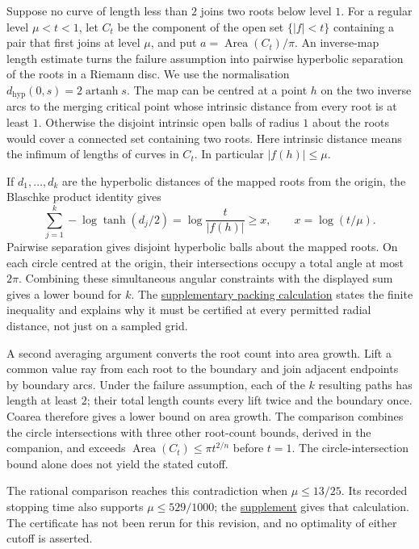 \documentclass[11pt]{article}
\begin{document}
Suppose no curve of length less than $2$ joins two roots below level $1$.
For a regular level $\mu<t<1$, let $C_t$ be the component of the open set
$\{|f|<t\}$ containing a pair that first joins at level $\mu$, and put
$a=\operatorname{Area}(C_t)/\pi$. An inverse-map length estimate turns
the failure assumption into pairwise hyperbolic separation of the roots
in a Riemann disc. We use the normalisation
$d_{\mathrm{hyp}}(0,s)=2\operatorname{artanh}s$.
The map can be centred at a point $h$ on the two inverse arcs to the
merging critical point whose intrinsic distance from every root is at
least $1$. Otherwise the disjoint intrinsic open balls of radius $1$
about the roots would cover a connected set containing two roots.
Here intrinsic distance means the infimum of lengths of curves in $C_t$.
In particular $|f(h)|\le\mu$.

If $d_1,\ldots,d_k$ are the hyperbolic distances of the mapped roots
from the origin, the Blaschke product identity gives
\[
 \sum_{j=1}^k-\log\tanh(d_j/2)
 =\log\frac{t}{|f(h)|}\ge x,\qquad x=\log(t/\mu).
\]
Pairwise separation gives disjoint hyperbolic balls about the mapped
roots. On each circle centred at the origin, their intersections occupy
a total angle at most $2\pi$. Combining these simultaneous angular
constraints with the displayed sum gives a lower bound for $k$.
The \hyperlink{circle-packing-inputs}{supplementary packing calculation}
states the finite inequality and explains why it must be certified at
every permitted radial distance, not just on a sampled grid.

A second averaging argument converts the root count into area growth.
Lift a common value ray from each root to the boundary and join adjacent
endpoints by boundary arcs. Under the failure assumption, each of the
$k$ resulting paths has length at least $2$; their total length counts
every lift twice and the boundary once. Coarea therefore gives a lower
bound on area growth. The comparison combines the circle intersections
with three other root-count bounds, derived in the companion, and
exceeds $\operatorname{Area}(C_t)\le\pi t^{2/n}$ before $t=1$.
The circle-intersection bound alone does not yield the stated cutoff.

The rational comparison reaches this contradiction when $\mu\le13/25$.
Its recorded stopping time also supports $\mu\le529/1000$; the
\hyperlink{certificate-stopping-time}{supplement} gives that calculation.
The certificate has not been rerun for this revision, and no optimality
of either cutoff is asserted.
\end{document}
